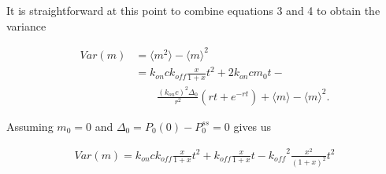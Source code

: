 It is straightforward at this point to combine equations 3 and 4 to obtain the variance

\begin{equation}
\begin{aligned}
Var(m) & = \langle m^2 \rangle - {\langle m \rangle}^2\\
	   & = k_{on}c k_{off} \frac{x}{1+x}t^2 + 2 k_{on}c m_0t - \\ 
	   & \qquad \frac{(k_{on} c)^2 \Delta_0}{r^2}(rt+e^{-rt}) + \langle m \rangle - {\langle m \rangle}^2.
\end{aligned}
\end{equation}

Assuming $m_0=0$ and $\Delta_0 = P_0(0) - P_0^{ss} = 0$ gives us

\begin{equation}
\begin{aligned}
Var(m) = k_{on}c k_{off} \frac{x}{1+x}t^2 + k_{off}\frac{x}{1+x}t - {k_{off}}^2\frac{x^2}{(1+x)^2}t^2
\end{aligned}
\end{equation}

